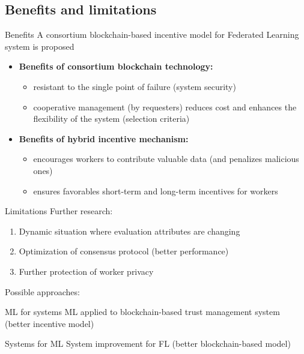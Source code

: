 \subsection{Benefits and limitations}

\begin{frame}{Benefits}
	A consortium blockchain-based incentive model for Federated Learning system is
proposed
  \begin{itemize}
  \item \textbf{Benefits of consortium blockchain technology:} 
  	\begin{itemize}
  		\item resistant to the single point of failure (system security)
  		\item cooperative management (by requesters) reduces cost and enhances the flexibility of the system (selection criteria)
  	\end{itemize}
  \item \textbf{Benefits of hybrid incentive mechanism:}
  	\begin{itemize}
  		\item encourages workers to contribute valuable data (and penalizes malicious ones)
  		\item ensures favorables short-term and long-term incentives for workers
  	\end{itemize}
  \end{itemize}
\end{frame}

\begin{frame}{Limitations}
	Further research:
  \begin{enumerate}
  \item Dynamic situation where evaluation attributes are changing
  \item Optimization of consensus protocol (better performance)
  \item Further protection of worker privacy
  \end{enumerate}
  Possible approaches:
  \begin{block}{ML for systems}
  ML applied to blockchain-based trust management system (better incentive model)
  \end{block}
  \begin{block}{Systems for ML}
  System improvement for FL (better blockchain-based model)
  \end{block}
\end{frame}